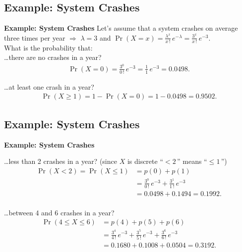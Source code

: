 \documentclass[compress]{beamer}        %
\makeatletter
\newcommand{\tcb}{\textcolor{beamer@blendedblue}}
\makeatother
\begin{document}
\subsection{Example: System Crashes}
\begin{frame}{\bf \tcb{Example: System Crashes}}\label{poisexample}
Let's assume that a system crashes on average three times per year $\Rightarrow$ $\lambda = 3$ and $\Pr(X = x) = \frac{\lambda^x}{x\,!}\,e^{-\lambda} = \frac{3^x}{x\,!}\,e^{-3}$.\\[0.4cm]

What is the probability that:\\[0.6cm]

\ldots there are no crashes in a year?
\begin{align*}
\Pr(X=0) = \frac{3^0}{0\,!}\,e^{-3} = \frac{1}{1}\,e^{-3} = 0.0498.
\end{align*}

\ldots at least one crash in a year?
\begin{align*}
\Pr(X\ge1) = 1 - \Pr(X=0) = 1-0.0498 = 0.9502.
\end{align*}


\end{frame}




\subsection{Example: System Crashes}
\begin{frame}{\bf \tcb{Example: System Crashes}}\label{poisranexample}

\ldots less than 2 crashes in a year? {\footnotesize(since $X$ is discrete ``$< 2\,$'' means ``$\le 1\,$'')}
\begin{align*}
\Pr(X<2) = \Pr(X\le1) &= p(0) + p(1) \\[0.2cm]
&= \frac{3^0}{0\,!}\,e^{-3} + \frac{3^1}{1\,!}\,e^{-3} \\[0.2cm]
& = 0.0498 + 0.1494 = 0.1992.\\
\end{align*}


\ldots between 4 and 6 crashes in a year?
\begin{align*}
\Pr(4\le X \le 6) &= p(4) + p(5) + p(6) \\[0.2cm]
&= \frac{3^4}{4\,!}\,e^{-3} + \frac{3^5}{5\,!}\,e^{-3} + \frac{3^6}{6\,!}\,e^{-3} \\[0.2cm]
&= 0.1680 +0.1008 + 0.0504 = 0.3192.
\end{align*}

\end{frame}
\end{document}
